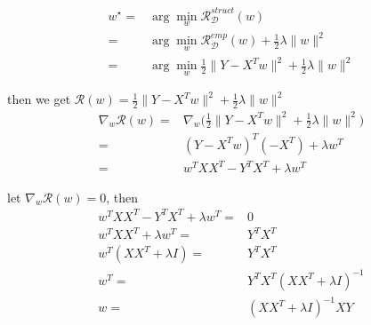 \documentclass[../main.tex]{subfiles}
\begin{document}
\begin{align*}
    w^\star
    = & \arg \min_w \mathcal{R}^{struct}_\mathcal{D}(w) \\
    = & \arg \min_w \mathcal{R}^{emp}_\mathcal{D}(w)
        + \frac{1}{2} \lambda \| w \|^2 \\
    = & \arg \min_w \frac{1}{2} \| Y - X^T w \|^2
        + \frac{1}{2} \lambda \| w \|^2
\end{align*}

then we get
$\mathcal{R}(w)
= \frac{1}{2} \| Y - X^T w \|^2
+ \frac{1}{2} \lambda \| w \|^2$
\begin{align*}
    \nabla_w \mathcal{R}(w)
    = & \nabla_w \big( \frac{1}{2} \| Y - X^T w \|^2
        + \frac{1}{2} \lambda \| w \|^2 \big) \\
    = & (Y - X^T w)^T (-X^T) + \lambda w^T \\
    = & w^T X X^T - Y^T X^T + \lambda w^T
\end{align*}

let $\nabla_w \mathcal{R}(w) = 0$, then
\begin{align*}
    w^T X X^T - Y^T X^T + \lambda w^T
    = & 0 \\
    w^T X X^T + \lambda w^T
    = & Y^T X^T \\
    w^T (X X^T + \lambda I)
    = & Y^T X^T \\
    w^T
    = & Y^T X^T (X X^T + \lambda I)^{-1} \\
    w
    = & (X X^T + \lambda I)^{-1} X Y
\end{align*}
\end{document}
